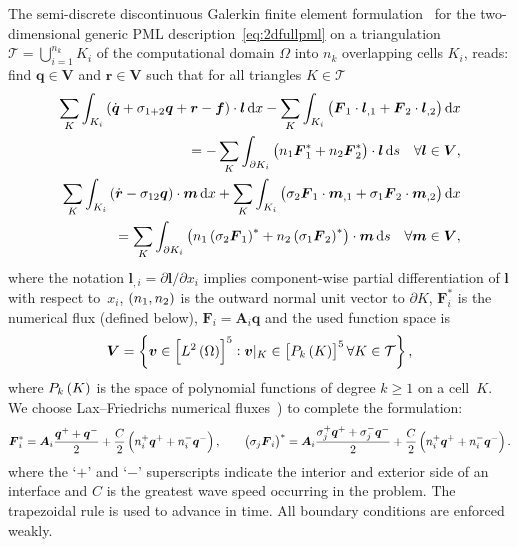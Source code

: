 \documentclass[a4paper]{article}
\renewcommand{\vec}{\boldsymbol}
\begin{document}
The semi-discrete discontinuous Galerkin finite element formulation~
for the two-dimensional generic PML description~\eqref{eq:2dfullpml}
on a triangulation $\mathcal{T} = \bigcup_{i=1}^{n_{k}} K_{i}$ of the
computational domain $\Omega$ into $n_{k}$ overlapping cells $K_{i}$,
reads: find $\vec{q} \in \vec{V}$ and $\vec{r} \in \vec{V}$ such that
for all triangles $K \in \mathcal{T}$
\begin{equation}
  \begin{aligned}
    \sum_{K} \int_{K_{i}} \del{\Dot{\vec{q}} + \sigma_{1+2}\vec{q} + \vec{r}
      - \vec{f}} \cdot \vec{l} \dif x
    - \sum_{K} \int_{K_{i}} \del{\vec{F}_{1}\cdot \vec{l}_{,1}
      + \vec{F}_{2} \cdot \vec{l}_{,2}} \dif x
\\ \quad \quad \quad \quad
    = - \sum_{K} \int_{\partial K_{i}} \del{n_1 \vec{F}_{1}^{*}+n_2
    \vec{F}_{2}^{*}}
    \cdot \vec{l} \dif s
    \quad \forall \vec{l} \in \vec{V},
    \\
    \sum_{K} \int_{K_{i}} \del{\Dot{\vec{r}}
      - \sigma_{12}\vec{q}} \cdot \vec{m} \dif x
    + \sum_{K} \int_{K_{i}} \del{\sigma_{2}\vec{F}_{1}\cdot \vec{m}_{,1}
      +  \sigma_{1}\vec{F}_{2} \cdot \vec{m}_{,2}} \dif x
\\ \quad \quad \quad \quad
    =
    \sum_{K} \int_{\partial K_{i}} \del{n_1
    \del{\sigma_{2}\vec{F}_{1}}^{*}+n_2
        \del{\sigma_{1}\vec{F}_{2}}^{*}} \cdot
    \vec{m} \dif s \quad \forall \vec{m} \in \vec{V},
  \end{aligned}
  \label{eq:globalweak}
\end{equation}
where the notation $\vec{l}_{,i} = \partial \vec{l}/ \partial x_{i}$
implies component-wise partial differentiation of $\vec{l}$ with
respect to~$x_{i}$, $\del{n_1,n_2}$ is the outward normal unit vector
to $\partial K$, $\vec{F}_{i}^{*}$ is the numerical flux (defined
below), $\vec{F}_{i} = \vec{A}_{i}\vec{q}$ and the used function space
is
\begin{equation}
  \vec{V}
  = \cbr{\vec{v} \in \sbr{L^{2}\del{\Omega}}^{5}
    : \vec{v}|_K \in \sbr{P_{k}\del{K}}^{5} \forall K \in \mathcal{T}},
\end{equation}
where $P_{k}\del{K}$ is the space of polynomial functions of degree $k
\geq 1$ on a cell~$K$. We choose Lax--Friedrichs numerical
fluxes~\cite[p.~34]{hesthaven08warburton}) to complete the
formulation:
\begin{equation}
    \vec{F}^{*}_i = \vec{A}_{i} \dfrac{\vec{q}^{+} + \vec{q}^{-}}{2} +
    \frac{C}{2}\del{n_i^{+} \vec{q}^{+} + n_{i}^{-} \vec{q}^{-}},
    \qquad
    \del{\sigma_j\vec{F}_i}^{*} = \vec{A}_{i} \dfrac{\sigma_j^{+}\vec{q}^{+}
    + \sigma_j^{-}\vec{q}^{-}}{2} +
    \frac{C}{2}\del{n_i^{+} \vec{q}^{+} + n_{i}^{-}
    \vec{q}^{-}}.
    \label{eq:numflux}
\end{equation}
where the `$+$' and `$-$' superscripts indicate the interior and
exterior side of an interface and $C$ is the greatest wave speed
occurring in the problem. The trapezoidal rule is used to advance in
time. All boundary conditions are enforced weakly.
\end{document}
